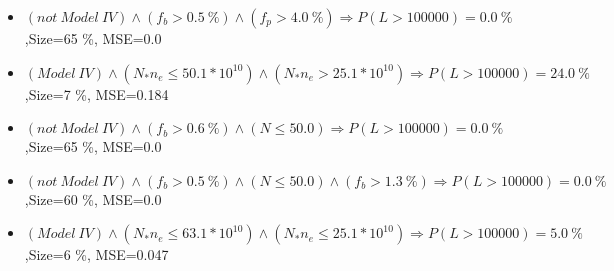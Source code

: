 \documentclass[numbered]{CSL}
\begin{document}
\begin{itemize}
\item $(not~Model~IV) \land (f_b > 0.5~\%) \land (f_p > 4.0~\%) \Rightarrow P(L > 100 000) = 0.0~\%$,\hfill Size=65 \%, MSE=0.0
\item $(Model~IV) \land (N_* n_e \leq 50.1 * 10^{10}) \land (N_* n_e > 25.1 * 10^{10}) \Rightarrow P(L > 100 000) = 24.0~\%$,\hfill Size=7 \%, MSE=0.184
\item $(not~Model~IV) \land (f_b > 0.6~\%) \land (N \leq 50.0) \Rightarrow P(L > 100 000) = 0.0~\%$,\hfill Size=65 \%, MSE=0.0
\item $(not~Model~IV) \land (f_b > 0.5~\%) \land (N \leq 50.0) \land (f_b > 1.3~\%) \Rightarrow P(L > 100 000) = 0.0~\%$,\hfill Size=60 \%, MSE=0.0
\item $(Model~IV) \land (N_* n_e \leq 63.1 * 10^{10}) \land (N_* n_e \leq 25.1 * 10^{10}) \Rightarrow P(L > 100 000) = 5.0~\%$,\hfill Size=6 \%, MSE=0.047
\end{itemize}
\end{document}
